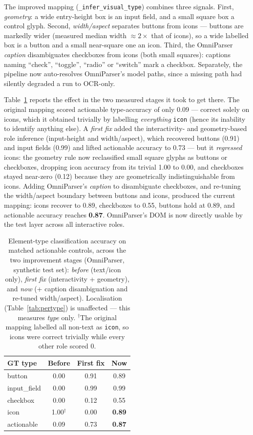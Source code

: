 \documentclass[11pt,a4paper]{article}
\newcommand{\code}[1]{\texttt{#1}}
\begin{document}
The improved mapping (\code{\_infer\_visual\_type}) combines three signals. First,
\emph{geometry}: a wide entry-height box is an input field, and a small square box a
control glyph. Second, \emph{width/aspect} separates buttons from icons --- buttons
are markedly wider (measured median width $\approx 2\times$ that of icons), so a
wide labelled box is a button and a small near-square one an icon. Third, the
OmniParser \emph{caption} disambiguates checkboxes from icons (both small squares):
captions naming ``check'', ``toggle'', ``radio'' or ``switch'' mark a checkbox.
Separately, the pipeline now auto-resolves OmniParser's model paths, since a missing
path had silently degraded a run to OCR-only.

Table~\ref{tab:typeacc} reports the effect in the two measured stages it took to
get there. The original mapping scored actionable type-accuracy of only 0.09 ---
correct solely on icons, which it obtained trivially by labelling \emph{everything}
\code{icon} (hence its inability to identify anything else). A \emph{first fix} added
the interactivity- and geometry-based role inference (input-height and width/aspect),
which recovered buttons (0.91) and input fields (0.99) and lifted actionable accuracy
to 0.73 --- but it \emph{regressed} icons: the geometry rule now reclassified small
square glyphs as buttons or checkboxes, dropping icon accuracy from its trivial 1.00
to 0.00, and checkboxes stayed near-zero (0.12) because they are geometrically
indistinguishable from icons. Adding OmniParser's \emph{caption} to disambiguate
checkboxes, and re-tuning the width/aspect boundary between buttons and icons,
produced the current mapping: icons recover to 0.89, checkboxes to 0.55, buttons
hold at 0.89, and actionable accuracy reaches \textbf{0.87}. OmniParser's DOM is now
directly usable by the test layer across all interactive roles.

\begin{table}[H]
  \centering
  \caption{Element-type classification accuracy on matched actionable controls,
  across the two improvement stages (OmniParser, synthetic test set):
  \emph{before} (text/icon only), \emph{first fix} (interactivity + geometry), and
  \emph{now} (+ caption disambiguation and re-tuned width/aspect). Localisation
  (Table~\ref{tab:pertype}) is unaffected --- this measures \emph{type} only.
  $^\dagger$The original mapping labelled all non-text as \code{icon}, so icons were
  correct trivially while every other role scored 0.}
  \label{tab:typeacc}
  \begin{tabular}{lccc}
    \toprule
    GT type & Before & First fix & Now \\
    \midrule
    button       & 0.00 & 0.91 & 0.89 \\
    input\_field & 0.00 & 0.99 & 0.99 \\
    checkbox     & 0.00 & 0.12 & 0.55 \\
    icon         & 1.00$^\dagger$ & 0.00 & \textbf{0.89} \\
    \midrule
    actionable   & 0.09 & 0.73 & \textbf{0.87} \\
    \bottomrule
  \end{tabular}
\end{table}
\end{document}
